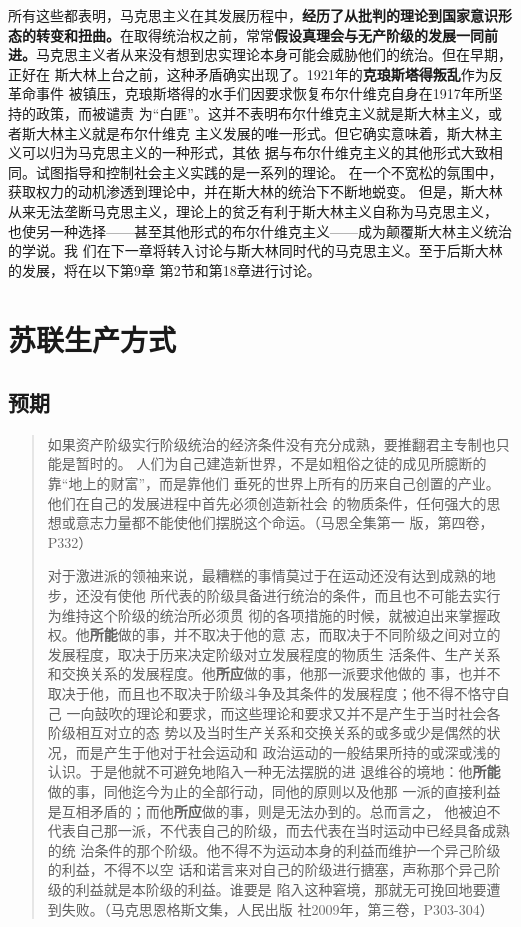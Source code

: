 所有这些都表明，马克思主义在其发展历程中，\textbf{经历了从批判的理论到国家意识形
  态的转变和扭曲。}在取得统治权之前，常常\textbf{假设真理会与无产阶级的发展一同前
  进。}马克思主义者从来没有想到忠实理论本身可能会威胁他们的统治。但在早期，正好在
斯大林上台之前，这种矛盾确实出现了。1921年的\textbf{克琅斯塔得叛乱}作为反革命事件
被镇压，克琅斯塔得的水手们因要求恢复布尔什维克自身在1917年所坚持的政策，而被谴责
为“白匪”。这并不表明布尔什维克主义就是斯大林主义，或者斯大林主义就是布尔什维克
主义发展的唯一形式。但它确实意味着，斯大林主义可以归为马克思主义的一种形式，其依
据与布尔什维克主义的其他形式大致相同。试图指导和控制社会主义实践的是一系列的理论。
在一个不宽松的氛围中，获取权力的动机渗透到理论中，并在斯大林的统治下不断地蜕变。
但是，斯大林从来无法垄断马克思主义，理论上的贫乏有利于斯大林主义自称为马克思主义，
也使另一种选择——甚至其他形式的布尔什维克主义——成为颠覆斯大林主义统治的学说。我
们在下一章将转入讨论与斯大林同时代的马克思主义。至于后斯大林的发展，将在以下第9章
第2节和第18章进行讨论。



\chapter{苏联生产方式}
\section{预期}

\begin{quotation}
  如果资产阶级实行阶级统治的经济条件没有充分成熟，要推翻君主专制也只能是暂时的。
  人们为自己建造新世界，不是如粗俗之徒的成见所臆断的靠“地上的财富”，而是靠他们
  垂死的世界上所有的历来自己创置的产业。他们在自己的发展进程中首先必须创造新社会
  的物质条件，任何强大的思想或意志力量都不能使他们摆脱这个命运。（马恩全集第一
  版，第四卷，P332）

  对于激进派的领袖来说，最糟糕的事情莫过于在运动还没有达到成熟的地步，还没有使他
  所代表的阶级具备进行统治的条件，而且也不可能去实行为维持这个阶级的统治所必须贯
  彻的各项措施的时候，就被迫出来掌握政权。他\textbf{所能}做的事，并不取决于他的意
  志，而取决于不同阶级之间对立的发展程度，取决于历来决定阶级对立发展程度的物质生
  活条件、生产关系和交换关系的发展程度。他\textbf{所应}做的事，他那一派要求他做的
  事，也并不取决于他，而且也不取决于阶级斗争及其条件的发展程度；他不得不恪守自己
  一向鼓吹的理论和要求，而这些理论和要求又并不是产生于当时社会各阶级相互对立的态
  势以及当时生产关系和交换关系的或多或少是偶然的状况，而是产生于他对于社会运动和
  政治运动的一般结果所持的或深或浅的认识。于是他就不可避免地陷入一种无法摆脱的进
  退维谷的境地：他\textbf{所能}做的事，同他迄今为止的全部行动，同他的原则以及他那
  一派的直接利益是互相矛盾的；而他\textbf{所应}做的事，则是无法办到的。总而言之，
  他被迫不代表自己那一派，不代表自己的阶级，而去代表在当时运动中已经具备成熟的统
  治条件的那个阶级。他不得不为运动本身的利益而维护一个异己阶级的利益，不得不以空
  话和诺言来对自己的阶级进行搪塞，声称那个异己阶级的利益就是本阶级的利益。谁要是
  陷入这种窘境，那就无可挽回地要遭到失败。（马克思恩格斯文集，人民出版
  社2009年，第三卷，P303-304）
\end{quotation}

